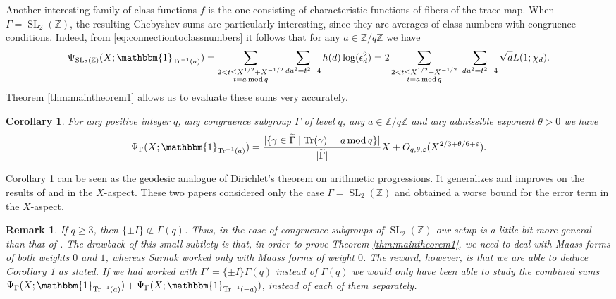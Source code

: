 \documentclass{article}
\newtheorem{cor}[thm]{Corollary}
\newtheorem{remark}[thm]{Remark}
\theoremstyle{named}
\newcommand{\Z}{\mathbb{Z}}
\DeclareMathOperator{\SL}{SL}
\DeclareMathOperator{\Tr}{Tr}
\DeclareMathOperator{\modulo}{mod}
\begin{document}
Another interesting family of class functions $f$ is the one consisting of characteristic functions of fibers of the trace map. When $\Gamma = \SL_2(\Z)$, the resulting Chebyshev sums are particularly interesting, since they are averages of class numbers with congruence conditions. Indeed, from \eqref{eq:connectiontoclassnumbers} it follows that for any $a \in \Z/q\Z$ we have
\begin{equation}
    \Psi_{\SL_2(\Z)}(X; \mathbbm{1}_{\Tr^{-1}(a)}) = \sum_{\substack{2 < t \leq X^{1/2} + X^{-1/2}\\
    t = a \modulo q}}\sum_{du^2 = t^2 - 4} h(d) \log(\epsilon_d^2) = 2\sum_{\substack{2 < t \leq X^{1/2} + X^{-1/2}\\
    t = a \modulo q}}\ \sum_{du^2 = t^2 - 4}  \sqrt{d}L(1; \chi_d).
\end{equation}
Theorem \ref{thm:maintheorem1} allows us to evaluate these sums very accurately.

\begin{cor}\label{cor:geodesicdirichlet}
For any positive integer $q$, any congruence subgroup $\Gamma$ of level $q$, any $a \in \Z/q\Z$ and any admissible exponent $\theta>0$ we have 
\begin{equation*}
    \Psi_\Gamma(X; \mathbbm{1}_{\Tr^{-1}(a)}) = \frac{|\{\gamma \in \widetilde{\Gamma} \mid \Tr(\gamma) = a \modulo q\}|}{|\widetilde{\Gamma}|}X + O_{q, \theta, \varepsilon}(X^{2/3 + \theta/6 + \varepsilon}).
\end{equation*}
\end{cor}

Corollary \ref{cor:geodesicdirichlet} can be seen as the geodesic analogue of Dirichlet's theorem on arithmetic progressions. It generalizes and improves on the results of \cite{Chatzakos_2024} and \cite{deitmar2025distributionprimegeodesictraces} in the $X$-aspect. These two papers considered only the case $\Gamma = \SL_2(\Z)$ and obtained a worse bound for the error term in the $X$-aspect. 

\begin{remark}
If $q \geq 3$, then $\{\pm I\} \not \subset \Gamma(q)$. Thus, in the case of congruence subgroups of $\SL_2(\Z)$ our setup is a little bit more general than that of \cite[Theorem 3.16]{sarnakthesis}. The drawback of this small subtlety is that, in order to prove Theorem \ref{thm:maintheorem1}, we need to deal with Maass forms of both weights $0$ and $1$, whereas Sarnak worked only with Maass forms of weight $0$. The reward, however, is that we are able to deduce Corollary \ref{cor:geodesicdirichlet} as stated. If we had worked with $\Gamma'=\{\pm I\}\Gamma(q)$ instead of $\Gamma(q)$ we would only have been able to study the combined sums $\Psi_\Gamma(X; \mathbbm{1}_{\Tr^{-1}(a)}) + \Psi_\Gamma(X; \mathbbm{1}_{\Tr^{-1}(-a)})$, instead of each of them separately.
\end{remark}
\end{document}
